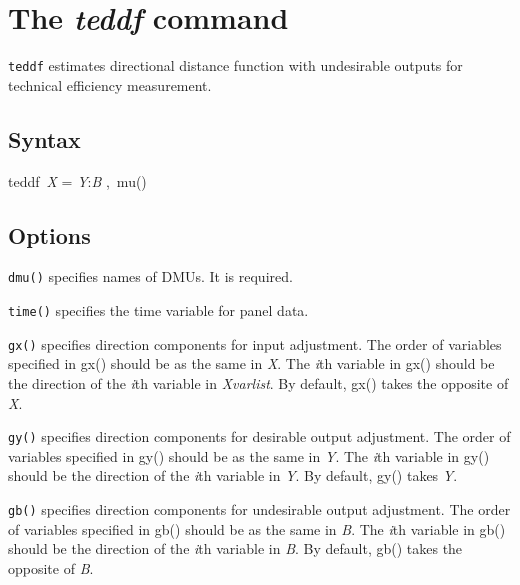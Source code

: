 
\section{The \textit{teddf} command}\label{sec_teddf}
{\tt teddf} estimates directional distance function with undesirable outputs for technical efficiency measurement.

\subsection{Syntax}
\begin{stsyntax}
	teddf\
	\textit{X\varlist} = \textit{Y\varlist}:\textit{B\varlist} \optif \optin,\
	mu(\varname)
\end{stsyntax}


\subsection{Options}

\hangpara
{\tt dmu(\varname)} specifies names of DMUs. It is required.

\hangpara
{\tt time(\varname)} specifies the time variable for panel data.

\hangpara
{\tt gx(\varlist)} specifies direction components for input adjustment. The order of variables specified in gx() should be as the same in \textit{X\varlist}. The \textit{i}th variable in gx() should be the direction of the \textit{i}th variable in \textit{Xvarlist}. By default, gx() takes the opposite of \textit{X\varlist}.

\hangpara
{\tt gy(\varlist)} specifies direction components for desirable output adjustment. The order of variables specified in gy() should be as the same in \textit{Y\varlist}. The \textit{i}th variable in gy() should be the direction of the \textit{i}th variable in \textit{Y\varlist}. By default, gy() takes \textit{Y\varlist}.

\hangpara
{\tt gb(\varlist)} specifies direction components for undesirable output adjustment. The order of variables specified in gb() should be as the same in \textit{B\varlist}. The \textit{i}th variable in gb() should be the direction of the \textit{i}th variable in \textit{B\varlist}. By default, gb() takes the opposite of \textit{B\varlist}.

